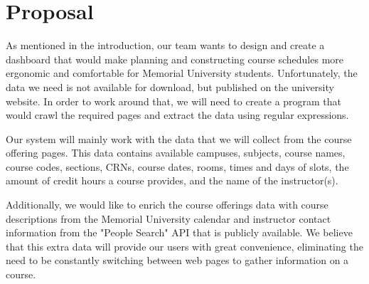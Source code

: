 \documentclass[12pt]{article}
\begin{document}
\section{Proposal}
As mentioned in the introduction, our team wants to design and create a dashboard that would make planning and constructing course schedules more ergonomic and comfortable for Memorial University students. 
Unfortunately, the data we need is not available for download, but published on the university website. In order to work around that, we will need to create a program that would crawl the required pages and extract 
the data using regular expressions. \par
Our system will mainly work with the data that we will collect from the course offering pages. This data contains available campuses, subjects, course names, course codes, sections, CRNs, course dates, rooms, times and days of slots, the amount of credit hours a course provides, and the name of the instructor(s). \par
Additionally, we would like to enrich the course offerings data with course descriptions from the Memorial University calendar and instructor contact information from the "People Search" API that is publicly 
available. We believe that this extra data will provide our users with great convenience, eliminating the need to be constantly switching between web pages to gather information on a course.
\end{document}
